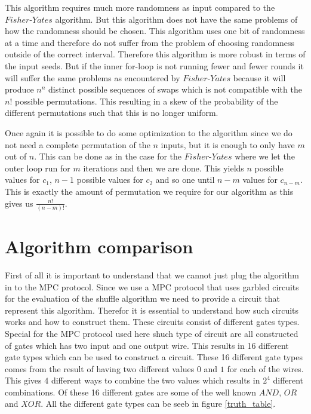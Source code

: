 This algorithm requires much more randomness as input compared to the $Fisher\text{-}Yates$ algorithm. But this algorithm does not have the same problems of how the randomness should be chosen. This algorithm uses one bit of randomness at a time and therefore do not suffer from the problem of choosing randomness outside of the correct interval. Therefore this algorithm is more robust in terms of the input seeds. But if the inner for-loop is not running fewer and fewer rounds it will suffer the same problems as encountered by $Fisher\text{-}Yates$ because it will produce $n^n$ distinct possible sequences of swaps which is not compatible with the $n!$ possible permutations. This resulting in a skew of the probability of the different permutations such that this is no longer uniform.

\bigskip
Once again it is possible to do some optimization to the algorithm since we do not need a complete permutation of the $n$ inputs, but it is enough to only have $m$ out of $n$. This can be done as in the case for the $Fisher\text{-}Yates$ where we let the outer loop run for $m$ iterations and then we are done. This yields $n$ possible values for $c_1$, $n-1$ possible values for $c_2$ and so one until $n-m$ values for $c_{n-m}$. This is exactly the amount of permutation we require for our algorithm as this gives us $\frac{n!}{(n-m)!}$.



\section{Algorithm comparison}
First of all it is important to understand that we cannot just plug the algorithm in to the MPC protocol. Since we use a MPC protocol that uses garbled circuits for the evaluation of the shuffle algorithm we need to provide a circuit that represent this algorithm. Therefor it is essential to understand how such circuits works and how to construct them. These circuits consist of different gates types. Special for the MPC protocol used here shuch type of circuit are all constructed of gates which has two input and one output wire. This results in 16 different gate types which can be used to construct a circuit. These 16 different gate types comes from the result of having two different values $0$ and $1$ for each of the wires. This gives $4$ different ways to combine the two values which results in $2^4$ different combinations. Of these 16 different gates are some of the well known $AND$, $OR$ and $XOR$. All the different gate types can be seeb in figure \ref{truth_table}.

